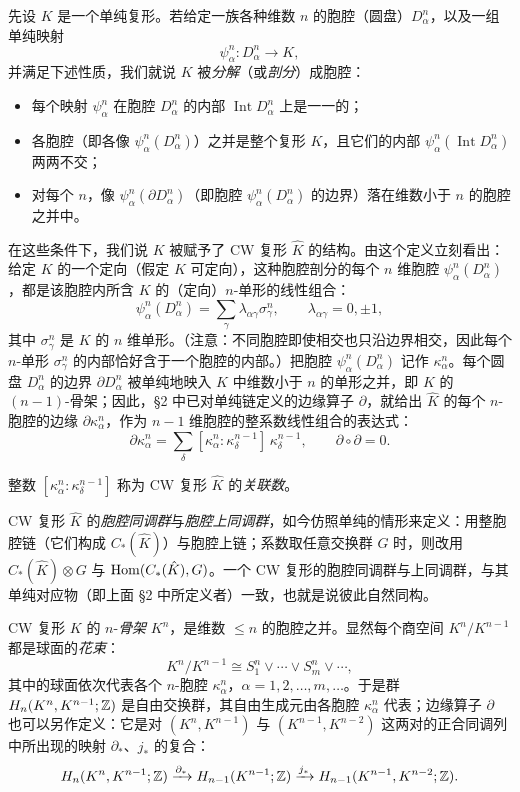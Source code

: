 先设 $K$ 是一个单纯复形。若给定一族各种维数 $n$ 的胞腔（圆盘）$D_\alpha^n$，以及一组单纯映射
\[
  \psi_\alpha^n: D_\alpha^n\to K,
\]
并满足下述性质，我们就说 $K$ 被\emph{分解}（或\emph{剖分}）成胞腔：
\begin{itemize}
  \item[(i)] 每个映射 $\psi_\alpha^n$ 在胞腔 $D_\alpha^n$ 的内部 $\operatorname{Int}D_\alpha^n$ 上是一一的；
  \item[(ii)] 各胞腔（即各像 $\psi_\alpha^n(D_\alpha^n)$）之并是整个复形 $K$，且它们的内部 $\psi_\alpha^n(\operatorname{Int}D_\alpha^n)$ 两两不交；
  \item[(iii)] 对每个 $n$，像 $\psi_\alpha^n(\partial D_\alpha^n)$（即胞腔 $\psi_\alpha^n(D_\alpha^n)$ 的边界）落在维数小于 $n$ 的胞腔之并中。
\end{itemize}

在这些条件下，我们说 $K$ 被赋予了 CW 复形 $\hat K$ 的结构。由这个定义立刻看出：给定 $K$ 的一个定向（假定 $K$ 可定向），这种胞腔剖分的每个 $n$ 维胞腔 $\psi_\alpha^n(D_\alpha^n)$，都是该胞腔内所含 $K$ 的（定向）$n$-单形的线性组合：
\[
  \psi_\alpha^n(D_\alpha^n)=\sum_\gamma\lambda_{\alpha\gamma}\sigma_\gamma^n,
  \qquad \lambda_{\alpha\gamma}=0,\pm1,
\]
其中 $\sigma_\gamma^n$ 是 $K$ 的 $n$ 维单形。（注意：不同胞腔即使相交也只沿边界相交，因此每个 $n$-单形 $\sigma_\gamma^n$ 的内部恰好含于一个胞腔的内部。）把胞腔 $\psi_\alpha^n(D_\alpha^n)$ 记作 $\kappa_\alpha^n$。每个圆盘 $D_\alpha^n$ 的边界 $\partial D_\alpha^n$ 被单纯地映入 $K$ 中维数小于 $n$ 的单形之并，即 $K$ 的 $(n-1)$-骨架；因此，§2 中已对单纯链定义的边缘算子 $\partial$，就给出 $\hat K$ 的每个 $n$-胞腔的边缘 $\partial\kappa_\alpha^n$，作为 $n-1$ 维胞腔的整系数线性组合的表达式：
\begin{equation}
  \partial\kappa_\alpha^n=\sum_\delta[\kappa_\alpha^n:\kappa_\delta^{n-1}]\,\kappa_\delta^{n-1},
  \qquad \partial\circ\partial=0. \tag{3.12}
\end{equation}

整数 $[\kappa_\alpha^n:\kappa_\delta^{n-1}]$ 称为 CW 复形 $\hat K$ 的\emph{关联数}。

CW 复形 $\hat K$ 的\emph{胞腔同调群}与\emph{胞腔上同调群}，如今仿照单纯的情形来定义：用整胞腔链（它们构成 $C_*(\hat K)$）与胞腔上链；系数取任意交换群 $G$ 时，则改用 $C_*(\hat K)\otimes G$ 与 $\operatorname{Hom}(C_*(\hat K),G)$。一个 CW 复形的胞腔同调群与上同调群，与其单纯对应物（即上面 §2 中所定义者）一致，也就是说彼此自然同构。

CW 复形 $K$ 的 $n$-\emph{骨架} $K^n$，是维数 $\le n$ 的胞腔之并。显然每个商空间 $K^n/K^{n-1}$ 都是球面的\emph{花束}：
\[
  K^n/K^{n-1}\cong S^n_1\vee\cdots\vee S^n_m\vee\cdots,
\]
其中的球面依次代表各个 $n$-胞腔 $\kappa_\alpha^n$，$\alpha=1,2,\dots,m,\dots$。于是群 $H_n(K^n,K^{n-1};\mathbb{Z})$ 是自由交换群，其自由生成元由各胞腔 $\kappa_\alpha^n$ 代表；边缘算子 $\partial$ 也可以另作定义：它是对 $(K^n,K^{n-1})$ 与 $(K^{n-1},K^{n-2})$ 这两对的正合同调列中所出现的映射 $\partial_*$、$j_*$ 的复合：
\[
  H_n(K^n,K^{n-1};\mathbb{Z})\xrightarrow{\partial_*}H_{n-1}(K^{n-1};\mathbb{Z})
  \xrightarrow{j_*}H_{n-1}(K^{n-1},K^{n-2};\mathbb{Z}).
\]

